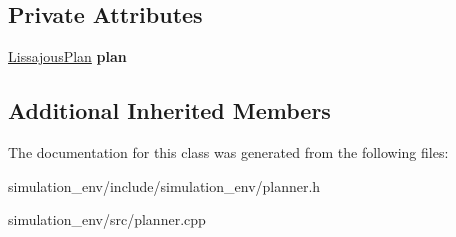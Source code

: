\subsection*{Private Attributes}
\begin{DoxyCompactItemize}
\item 
\hyperlink{structLissajousPlanner_1_1LissajousPlan}{Lissajous\+Plan} {\bfseries plan}\hypertarget{classLissajousPlanner_ac3365f9d9d84307b680a94cff01edd9b}{}\label{classLissajousPlanner_ac3365f9d9d84307b680a94cff01edd9b}

\end{DoxyCompactItemize}
\subsection*{Additional Inherited Members}


The documentation for this class was generated from the following files\+:\begin{DoxyCompactItemize}
\item 
simulation\+\_\+env/include/simulation\+\_\+env/planner.\+h\item 
simulation\+\_\+env/src/planner.\+cpp\end{DoxyCompactItemize}

